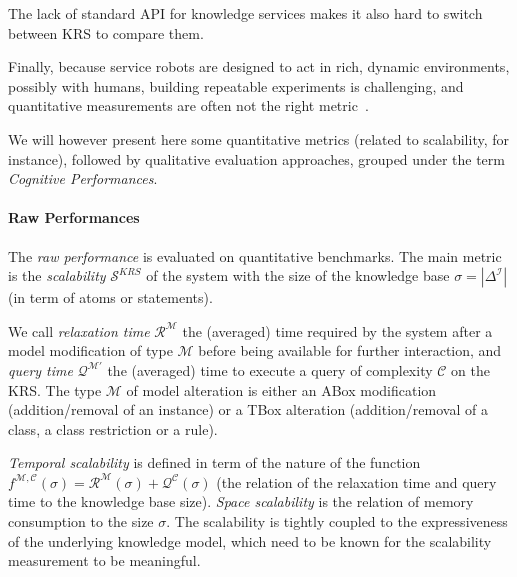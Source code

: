 The lack of standard API for knowledge services makes it also hard to switch
between KRS to compare them.

Finally, because service robots are designed to act in rich, dynamic
environments, possibly with humans, building repeatable experiments is
challenging, and quantitative measurements are often not the right
metric~\cite{Langley2006}.

We will however present here some quantitative metrics (related to scalability,
for instance), followed by qualitative evaluation approaches, grouped under the
term \emph{Cognitive Performances}.

\begin{scriptsize}
\begin{center}
\end{center}
\end{scriptsize}


\paragraph{Raw Performances} The \emph{raw performance} is evaluated on
quantitative benchmarks. The main metric is the \emph{scalability}
$\mathcal{S}^{KRS}$ of the system with the size of the knowledge base
$\sigma=|\Delta^{\mathcal{I}}|$  (in term of atoms or statements).

We call \emph{relaxation time} $\mathcal{R}^{\mathcal{M}}$ the (averaged) time
required by the system after a model modification of type $\mathcal{M}$ before
being available for further interaction, and \emph{query time}
$\mathcal{Q}^{\mathcal{M}'}$ the (averaged) time to execute a query of
complexity $\mathcal{C}$ on the KRS. The type $\mathcal{M}$ of model
alteration is either an ABox modification (addition/removal of an instance) or
a TBox alteration (addition/removal of a class, a class restriction or a rule).

\emph{Temporal scalability} is defined in term of the nature of the function
$f^{\mathcal{M}, \mathcal{C}}(\sigma) = \mathcal{R}^{\mathcal{M}}(\sigma) +
\mathcal{Q}^{\mathcal{C}}(\sigma)$ (\ie the relation of the relaxation time
and query time to the knowledge base size). \emph{Space scalability} is the
relation of memory consumption to the size $\sigma$. The scalability is tightly
coupled to the expressiveness of the underlying knowledge model, which need to
be known for the scalability measurement to be meaningful.

